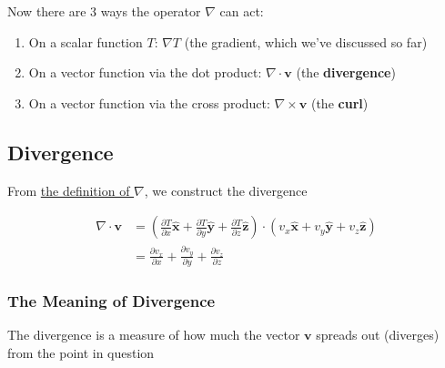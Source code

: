Now there are 3 ways the operator $\nabla$ can act:

\begin{enumerate}
    \item On a scalar function $T$: $\nabla T$ (the gradient, which we've discussed so far)
    \item On a vector function via the dot product: $\nabla \cdot \boldsymbol{v}$ (the \textbf{divergence})
    \item On a vector function via the cross product: $\nabla \times \boldsymbol{v}$ (the \textbf{curl})
\end{enumerate}

\subsection{Divergence}

From \hyperref[eq:def-gradient]{the definition of $\nabla$}, we construct the divergence

\begin{align}
    \nabla \cdot \boldsymbol{v} &= \left( \frac{\partial T}{\partial x}\boldsymbol{\hat{x}} + \frac{\partial T}{\partial y}\boldsymbol{\hat{y}} + \frac{\partial T}{\partial z}\boldsymbol{\hat{z}} \right) \cdot (v_x\boldsymbol{\hat{x}} + v_y\boldsymbol{\hat{y}} + v_z\boldsymbol{\hat{z}}) \label{eq:divergence-dot-product} \\
    &= \frac{\partial v_x}{\partial x} + \frac{\partial v_y}{\partial y} + \frac{\partial v_z}{\partial z}
\end{align}

\subsubsection{The Meaning of Divergence}

\begin{tcolorbox}[
    parbox=false,
    colbacktitle=red!10!white,
    colback=blue!10!white,coltitle=red!70!black,
    title=The Geometrical Interpretation of the Divergence
]
    The divergence is a measure of how much the vector $\boldsymbol{v}$ spreads out (diverges) from the point in question
\end{tcolorbox}

